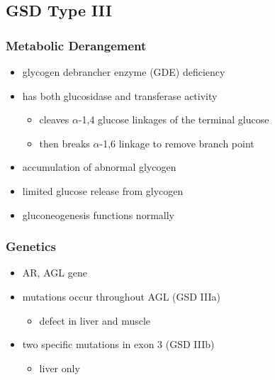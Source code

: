 \documentclass{scrartcl}
\begin{document}
\subsection{GSD Type III}
\label{sec:org2013c4c}
\subsubsection{Metabolic Derangement}
\label{sec:org35dc47b}
\begin{itemize}
\item glycogen debrancher enzyme (GDE) deficiency
\item has both glucosidase and transferase activity
\begin{itemize}
\item cleaves \(\alpha\)-1,4 glucose linkages of the terminal glucose
\item then breaks \(\alpha\)-1,6 linkage to remove branch point
\end{itemize}
\item accumulation of abnormal glycogen
\item limited glucose release from glycogen
\item gluconeogenesis functions normally
\end{itemize}
\subsubsection{Genetics}
\label{sec:org6de7352}
\begin{itemize}
\item AR, AGL gene
\item mutations occur throughout AGL (GSD IIIa)
\begin{itemize}
\item defect in liver and muscle
\end{itemize}
\item two specific mutations in exon 3 (GSD IIIb)
\begin{itemize}
\item liver only
\end{itemize}
\end{itemize}
\end{document}
